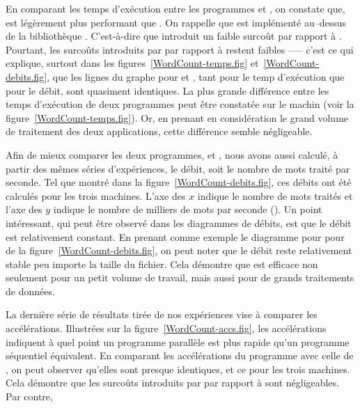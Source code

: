 En comparant les temps d'ex\'ecution entre les programmes  et , on constate que,  est l\'eg\`erement plus performant que . On rappelle que  est impl\'ement\'e au–dessus de la biblioth\`eque . C'est-\`a-dire que  introduit un faible surco\^ut par rapport \`a . Pourtant, les surco\^uts introduits par  par rapport \`a  restent faibles --— c'est ce qui explique, surtout dans les figures~\ref{WordCount-temps.fig} et~\ref{WordCount-debits.fig}, que les lignes du graphe pour  et , tant pour le temp d'ex\'ecution que pour le d\'ebit, sont quasiment identiques. La plus grande diff\'erence entre les temps d'ex\'ecution de deux programmes peut \^etre constat\'ee sur le machin  (voir la figure~\ref{WordCount-temps.fig}). Or, en prenant en consid\'eration le grand volume de traitement des deux applications, cette diff\'erence semble n\'egligeable.

Afin de mieux comparer les deux programmes,  et , nous avons aussi calculé, à partir des mêmes séries d'exp\'eriences, le d\'ebit, soit le nombre de mots trait\'e par seconde. Tel que montr\'e dans la figure~\ref{WordCount-debits.fig}, ces débits ont \'et\'e calculés pour les trois machines. L'axe des $x$ indique le nombre de mots trait\'es et l'axe des $y$ indique le nombre de milliers de mots par seconde (). Un point int\'eressant, qui peut \^etre observ\'e dans les diagrammes de d\'ebits, est que le d\'ebit est relativement constant. En prenant comme exemple le diagramme pour  pour  de la figure~\ref{WordCount-debits.fig}, on peut noter que le d\'ebit reste relativement stable peu importe la taille du fichier. Cela d\'emontre que  est efficace non seulement pour un petit volume de travail, mais aussi pour de grands traitements de donn\'ees.



La derni\`ere s\'erie de résultats tirée de nos exp\'eriences vise \`a comparer les acc\'el\'erations. Illustr\'ees sur la figure~\ref{WordCount-accs.fig}, les acc\'el\'erations indiquent \`a quel point un programme parall\`ele est plus rapide qu'un programme s\'equentiel \'equivalent. En comparant les acc\'el\'erations du programme  avec celle de , on peut observer qu'elles sont presque identiques, et ce pour les trois machines. Cela d\'emontre que les surco\^uts introduits par  par rapport \`a  sont n\'egligeables.  
%
Par contre, 

